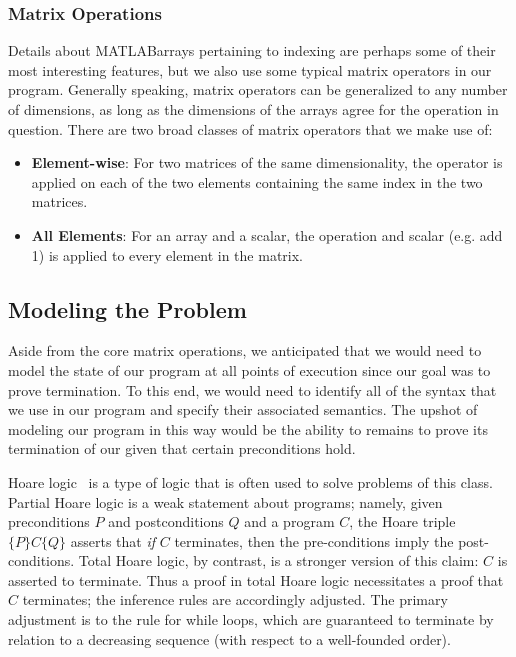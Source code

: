 \documentclass[11pt,conference]{IEEEtran}
\newcommand{\matlab}{MATLAB}
\theoremstyle{plain} %
\theoremstyle{definition}
\theoremstyle{remark}
\begin{document}
\subsubsection{Matrix Operations} \label{matrixoperations}
Details about \matlab\@ arrays pertaining to indexing are perhaps some of their most interesting features, but we also use some typical matrix operators in our program. Generally speaking, matrix operators can be generalized to any number of dimensions, as long as the dimensions of the arrays agree for the operation in question. There are two broad classes of matrix operators that we make use of:

\begin{itemize}
    \item \textbf{Element-wise}: For two matrices of the same dimensionality, the operator is applied on each of the two elements containing the same index in the two matrices.
    \item \textbf{All Elements}: For an array and a scalar, the operation and scalar (e.g. add 1) is applied to every element in the matrix.
\end{itemize}

\subsection{Modeling the Problem}
Aside from the core matrix operations, we anticipated that we would need to model the state of our program at all points of execution since our goal was to prove termination. To this end, we would need to identify all of the syntax that we use in our program and specify their associated semantics. The upshot of modeling our program in this way would be the ability to remains to prove its termination of our given that certain preconditions hold. 

Hoare logic~\cite{Hoare_1969} is a type of logic that is often used to solve problems of this class. Partial Hoare logic is a weak statement about programs; namely, given preconditions \(P\) and postconditions \(Q\) and a program \(C\), the Hoare triple \(\{P\}C\{Q\}\) asserts that \emph{if} \(C\) terminates, then the pre-conditions imply the post-conditions. Total Hoare logic, by contrast, is a stronger version of this claim: \(C\) is asserted to terminate. Thus a proof in total Hoare logic necessitates a proof that \(C\) terminates; the inference rules are accordingly adjusted. The primary adjustment is to the rule for while
loops, which are guaranteed to terminate by relation to a decreasing sequence
(with respect to a well-founded order).
\end{document}
